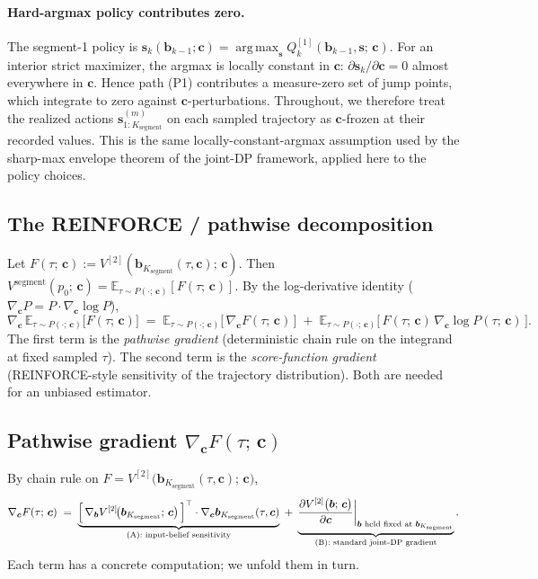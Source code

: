 \documentclass[11pt,a4paper]{article}
\newcommand{\bc}{\bm{c}}
\newcommand{\bs}{\bm{s}}
\newcommand{\bb}{\bm{b}}
\newcommand{\E}{\mathbb{E}}
\newcommand{\argmax}{\operatorname*{arg\,max}}
\begin{document}
\paragraph{Hard-argmax policy contributes zero.}
The segment-1 policy is $\bs_k(\bb_{k-1}; \bc) = \argmax_{\bs} Q^{[1]}_k(\bb_{k-1}, \bs;\, \bc)$.
For an interior strict maximizer, the argmax is locally constant in $\bc$:
$\partial \bs_k / \partial \bc = 0$ almost everywhere in $\bc$.  Hence path (P1)
contributes a measure-zero set of jump points, which integrate to zero against
$\bc$-perturbations.  Throughout, we therefore treat the realized actions
$\bs^{(m)}_{1:K_\mathrm{segment}}$ on each sampled trajectory as
$\bc$-frozen at their recorded values.  This is the same locally-constant-argmax
assumption used by the sharp-max envelope theorem of the joint-DP framework, applied here
to the policy choices.

\subsection{The REINFORCE / pathwise decomposition}
\label{sec:reinforce}

Let $F(\tau;\, \bc) := V^{[2]}(\bb_{K_\mathrm{segment}}(\tau, \bc);\, \bc)$.  Then
$V^\mathrm{segment}(p_0;\, \bc) = \E_{\tau \sim P(\cdot;\, \bc)}[F(\tau;\, \bc)]$.  By the
log-derivative identity ($\nabla_{\bc} P = P \cdot \nabla_{\bc} \log P$),
\begin{equation}
\nabla_{\bc}\, \E_{\tau \sim P(\cdot;\, \bc)}\!\bigl[F(\tau;\, \bc)\bigr]
\;=\;
\E_{\tau \sim P(\cdot;\, \bc)}\!\bigl[\,\nabla_{\bc} F(\tau;\, \bc)\,\bigr]
\;+\;
\E_{\tau \sim P(\cdot;\, \bc)}\!\bigl[\,F(\tau;\, \bc)\, \nabla_{\bc} \log P(\tau;\, \bc)\,\bigr].
\label{eq:reinforce}
\end{equation}
The first term is the \emph{pathwise gradient} (deterministic chain rule on the integrand
at fixed sampled $\tau$).  The second term is the \emph{score-function gradient}
(REINFORCE-style sensitivity of the trajectory distribution).  Both are needed for an
unbiased estimator.

\subsection{Pathwise gradient \texorpdfstring{$\nabla_{\bc} F(\tau;\, \bc)$}{nabla\_c F}}
\label{sec:pathwise}

By chain rule on $F = V^{[2]}\bigl(\bb_{K_\mathrm{segment}}(\tau, \bc);\, \bc\bigr)$,
\begin{equation}
\nabla_{\bc} F(\tau;\, \bc)
\;=\;
\underbrace{\Bigl[\,\nabla_{\bb} V^{[2]}\!\bigl(\bb_{K_\mathrm{segment}};\, \bc\bigr)\,\Bigr]^\top \cdot \nabla_{\bc} \bb_{K_\mathrm{segment}}(\tau, \bc)}_{\text{(A): input-belief sensitivity}}
\;+\;
\underbrace{\biggl.\frac{\partial V^{[2]}\bigl(\bb;\, \bc\bigr)}{\partial \bc}\biggr|_{\bb \text{ held fixed at } \bb_{K_\mathrm{segment}}}}_{\text{(B): standard joint-DP gradient}}.
\label{eq:pathwise}
\end{equation}
Each term has a concrete computation; we unfold them in turn.
\end{document}
